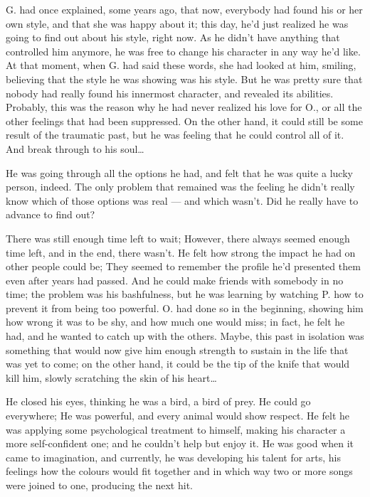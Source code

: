 G. had once explained, some years ago, that now, everybody had found his or her own style, and that she was happy about it; this day, he'd just realized he was going to find out about his style, right now. As he didn't have anything that controlled him anymore, he was free to change his character in any way he'd like. At that moment, when G. had said these words, she had looked at him, smiling, believing that the style he was showing was his style. But he was pretty sure that nobody had really found his innermost character, and revealed its abilities. 
Probably, this was the reason why he had never realized his love for O., or all the other feelings that had been suppressed. On the other hand, it could still be some result of the traumatic past, but he was feeling that he could control all of it. 
And break through to his soul\ldots

He was going through all the options he had, and felt that he was quite a lucky person, indeed. The only problem that remained was the feeling he didn't really know which of those options was real --- and which wasn't. Did he really have to advance to find out?

There was still enough time left to wait; However, there always seemed enough time left, and in the end, there wasn't. 
He felt how strong the impact he had on other people could be; They seemed to remember the profile he'd presented them even after years had passed. 
And he could make friends with somebody in no time; the problem was his bashfulness, but he was learning by watching P. how to prevent it from being too powerful. O. had done so in the beginning, showing him how wrong it was to be shy, and how much one would miss; in fact, he felt he had, and he wanted to catch up with the others. Maybe, this past in isolation was something that would now give him enough strength to sustain in the life that was yet to come; on the other hand, it could be the tip of the knife that would kill him, slowly scratching the skin of his heart\ldots

He closed his eyes, thinking he was a bird, a bird of prey. He could go everywhere; He was powerful, and every animal would show respect. He felt he was applying some psychological treatment to himself, making his character a more self-confident one; and he couldn't help but enjoy it. He was good when it came to imagination, and currently, he was developing his talent for arts, his feelings how the colours would fit together and in which way two or more songs were joined to one, producing the next hit.

